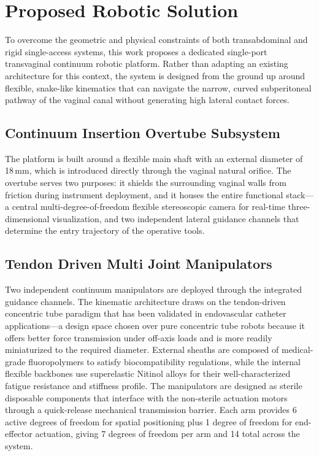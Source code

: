 \documentclass{article}
\begin{document}
\section{Proposed Robotic Solution}

To overcome the geometric and physical constraints of both transabdominal and rigid single-access systems, this work proposes a dedicated single-port transvaginal continuum robotic platform. Rather than adapting an existing architecture for this context, the system is designed from the ground up around flexible, snake-like kinematics that can navigate the narrow, curved subperitoneal pathway of the vaginal canal without generating high lateral contact forces.

\subsection{Continuum Insertion Overtube Subsystem}
The platform is built around a flexible main shaft with an external diameter of 18\,mm, which is introduced directly through the vaginal natural orifice. The overtube serves two purposes: it shields the surrounding vaginal walls from friction during instrument deployment, and it houses the entire functional stack---a central multi-degree-of-freedom flexible stereoscopic camera for real-time three-dimensional visualization, and two independent lateral guidance channels that determine the entry trajectory of the operative tools.

\subsection{Tendon Driven Multi Joint Manipulators}
Two independent continuum manipulators are deployed through the integrated guidance channels. The kinematic architecture draws on the tendon-driven concentric tube paradigm that has been validated in endovascular catheter applications---a design space chosen over pure concentric tube robots because it offers better force transmission under off-axis loads and is more readily miniaturized to the required diameter. External sheaths are composed of medical-grade fluoropolymers to satisfy biocompatibility regulations, while the internal flexible backbones use superelastic Nitinol alloys for their well-characterized fatigue resistance and stiffness profile. The manipulators are designed as sterile disposable components that interface with the non-sterile actuation motors through a quick-release mechanical transmission barrier. Each arm provides 6 active degrees of freedom for spatial positioning plus 1 degree of freedom for end-effector actuation, giving 7 degrees of freedom per arm and 14 total across the system.
\end{document}
